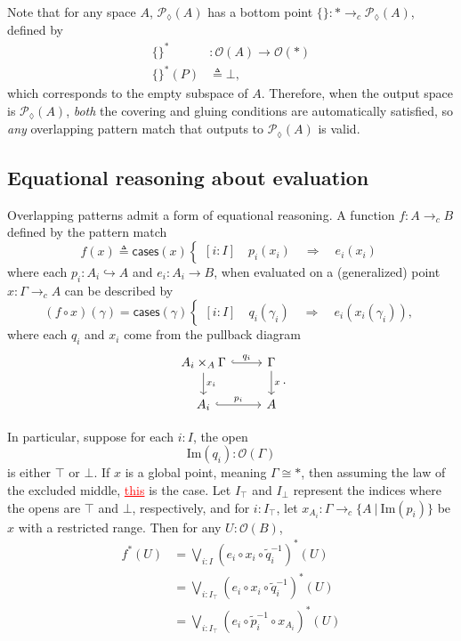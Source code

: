 \documentclass[conference]{IEEEtran}
\newcommand{\PLower}{\mathcal{P}_\lozenge}
\newcommand{\hookto}{\hookrightarrow}
\newcommand{\cto}{\to_c}
\newcommand{\suchthat}{\ |\ }
\newcommand{\One}{\ast}
\newcommand{\Open}[1]{\mathcal{O}({#1})}
\newcommand{\Img}[1]{\text{Im}\left({#1}\right)}
\newcommand{\Branch}{\Rightarrow}
\newcommand{\iimg}[1]{{#1}^*}
\newcommand{\grammar}[1]{\textcolor{red}{\underline{#1}}}
\begin{document}
Note that for any space $A$, $\PLower(A)$ has a bottom point $\{ \} : \One \cto \PLower(A)$, defined by
\begin{align*}
\iimg{\{\}} &: \Open{A} \to \Open{\One}
\\ \iimg{\{ \}}(P) &\triangleq \bot,
\end{align*}
which corresponds to the empty subspace of $A$. Therefore, when the output space is $\PLower(A)$, \emph{both} the covering and gluing conditions are automatically satisfied, so \emph{any} overlapping pattern match that outputs to $\PLower(A)$ is valid.

\subsection{Equational reasoning about evaluation}

Overlapping patterns admit a form of equational reasoning. A function $f : A \cto B$ defined by the pattern match
\[
f(x) \triangleq \mathsf{cases}(x)
\begin{cases}
[i : I] \quad p_i(x_i) \quad \Branch \quad e_i(x_i)
\end{cases}
\]
where each $p_i : A_i \hookto A$ and $e_i : A_i \to B$,
when evaluated on a (generalized) point $x : \Gamma \cto A$
can be described by
\[
(f \circ x)(\gamma) = \mathsf{cases}(\gamma)
\begin{cases}
[i : I] \quad q_i(\gamma_i) \quad \Branch \quad e_i(x_i(\gamma_i)),
\end{cases}
\]
where each $q_i$ and $x_i$ come from the pullback diagram
\begin{equation*}
\begin{tikzcd}
A_i \times_A \Gamma \arrow[r, hook, "q_i"]
   \arrow[d, "x_i"]
& \Gamma \arrow[d, "x"]
\\ A_i \arrow[r, hook, "p_i"]
& A
\end{tikzcd}.
\end{equation*}

In particular, suppose for each $i : I$, the open
\[
\Img{q_i} : \Open{\Gamma}
\]
is either $\top$ or $\bot$. If $x$ is a global point, meaning $\Gamma \cong \One$, then assuming the law of the excluded middle, \grammar{this} is the case. Let $I_\top$ and $I_\bot$ represent the indices where the opens are $\top$ and $\bot$, respectively, and for $i : I_\top$, let $x_{A_i} : \Gamma \cto \{ A \suchthat \Img{p_i} \}$ be $x$ with a restricted range. Then for any $U : \Open{B}$,
\begin{align*}
\iimg{f}(U) &= \bigvee_{i : I} \iimg{(e_i \circ x_i \circ \tilde{q}_i^{-1})}(U)
\\ &= \bigvee_{i : I_\top} \iimg{(e_i \circ x_i \circ \tilde{q}_i^{-1})}(U)
\\ &= \bigvee_{i : I_\top} \iimg{(e_i \circ \tilde{p}_i^{-1} \circ x_{A_i})}(U)
\end{align*}
\end{document}
